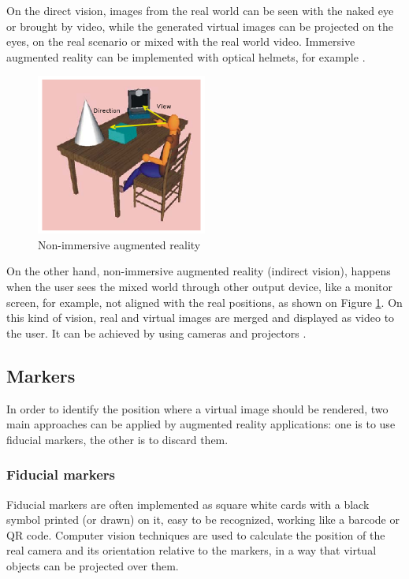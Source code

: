 \documentclass[msc, a4paper, classic, en]{ufbathesis}
\begin{document}
On the direct vision, images from the real world can be seen with the naked eye or brought by video, while the generated virtual images can be projected on the eyes, on the real scenario or mixed with the real world video. Immersive augmented reality can be implemented with optical helmets, for example \cite{tori2006fundamentos}.

\begin{figure}
\centering
\includegraphics[width=0.5\textwidth]{images/indirect.png}
\caption{Non-immersive augmented reality \cite{tori2006fundamentos}}
\label{fig:indirect}
\end{figure}

On the other hand, non-immersive augmented reality (indirect vision), happens when the user sees the mixed world through other output device, like a monitor screen, for example, not aligned with the real positions, as shown on Figure \ref{fig:indirect}. On this kind of vision, real and virtual images are merged and displayed as video to the user. It can be achieved by using cameras and projectors \cite{tori2006fundamentos}.

\subsection{Markers}

In order to identify the position where a virtual image should be rendered, two main approaches can be applied by augmented reality applications: one is to use fiducial markers, the other is to discard them.

\subsubsection{Fiducial markers}

Fiducial markers are often implemented as square white cards with a black symbol printed (or drawn) on it, easy to be recognized, working like a barcode or QR code. Computer vision techniques are used to calculate the position of the real camera and its orientation relative to the markers, in a way that virtual objects can be projected over them.
\end{document}
